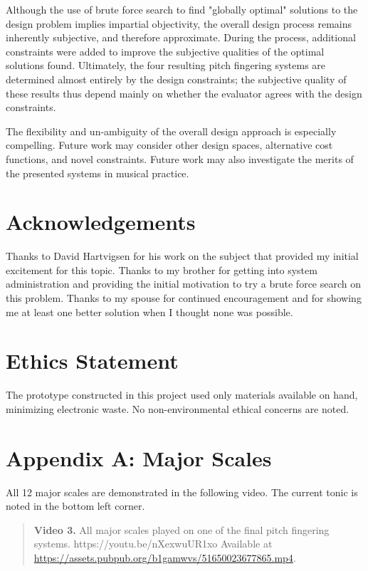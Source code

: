 \documentclass[sigconf]{nimeart}
\begin{document}
Although the use of brute force search to find "globally optimal" solutions to the design problem implies impartial objectivity, the overall design process remains inherently subjective, and therefore approximate. During the process, additional constraints were added to improve the subjective qualities of the optimal solutions found. Ultimately, the four resulting pitch fingering systems are determined almost entirely by the design constraints; the subjective quality of these results thus depend mainly on whether the evaluator agrees with the design constraints.

The flexibility and un-ambiguity of the overall design approach is especially compelling. Future work may consider other design spaces, alternative cost functions, and novel constraints. Future work may also investigate the merits of the presented systems in musical practice.

\section{Acknowledgements}\label{acknowledgements}

Thanks to David Hartvigsen for his work on the subject that provided my initial excitement for this topic. Thanks to my brother for getting into system administration and providing the initial motivation to try a brute force search on this problem. Thanks to my spouse for continued encouragement and for showing me at least one better solution when I thought none was possible.

\section{Ethics Statement}\label{ethics-statement}

The prototype constructed in this project used only materials available on hand, minimizing electronic waste. No non-environmental ethical concerns are noted.

\section{Appendix A: Major Scales}\label{appendix-a-major-scales}

All 12 major scales are demonstrated in the following video. The current tonic is noted in the bottom left corner.


\begin{quote}\small\textbf{Video 3.} All major scales played on one of the final pitch fingering systems. https://youtu.be/nXexwuUR1xo Available at \url{https://assets.pubpub.org/b1gamwvs/51650023677865.mp4}.\end{quote}
\end{document}
